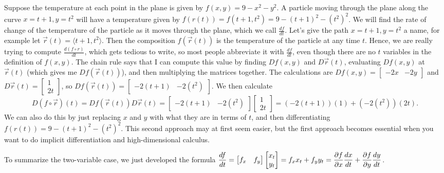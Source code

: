 \begin{example}
Suppose the temperature at each point
in the plane is given by {$f(x,y) = 9-x^2-y^2$}.  A particle moving
through the plane along the curve $x=t+1, y=t^2$ will have a
temperature given by $f(r(t)) = f(t+1,t^2) = 9-(t+1)^2-(t^2)^2$.  We
will find the rate of change of the temperature of the particle as it
moves through the plane, which we call {$\frac{df}{dt}$}. Let's give
the path $x=t+1, y=t^2$ a name, for example let {$\vec r(t) =
  \langle t+1,t^2\rangle$}.  Then the composition {$f(\vec r(t))$} is
the temperature of the particle at any time {$t$}.  Hence, we are
really trying to compute {$\frac{d(f\circ r)}{dt}$}, which gets tedious to
write, so most people abbreviate it with {$\frac{df}{dt}$}, even
though there are no {$t$} variables in the definition of {$f(x,y)$}.  The
chain rule says that I can compute this value by finding {$Df(x,y)$}
and {$D\vec r(t)$}, evaluating {$Df(x,y)$} at {$\vec r(t)$} (which
gives me {$Df(\vec r(t))$}), and then multiplying the matrices
together. The calculations are $Df(x,y) = \begin{bmatrix}-2x &
  -2y\end{bmatrix}$ and $D\vec r(t) = \begin{bmatrix}1\\
  2t\end{bmatrix}$, so $Df(\vec r(t)) =
\begin{bmatrix}-2(t+1) & -2(t^2)\end{bmatrix}$. We then calculate 
$$D(f\circ \vec r)(t) = Df(\vec r(t))D\vec r(t)=\begin{bmatrix}-2(t+1) &
  -2(t^2)\end{bmatrix} \begin{bmatrix}1\\ 2t\end{bmatrix}=
(-2(t+1))(1) + (-2(t^2))(2t).$$ We can also do this by just replacing
{$x$} and {$y$} with what they are in terms of $t$, and then
differentiating $f(r(t)) = 9-(t+1)^2-(t^2)^2$.  This second approach
may at first seem easier, but the first approach becomes essential
when you want to do implicit differentiation and high-dimensional
calculus.
\end{example}
  To summarize the two-variable case, we just developed the
formula $\displaystyle \frac{df}{dt}=\begin{bmatrix}f_x &
  f_y\end{bmatrix} \begin{bmatrix}x_t\\ y_t\end{bmatrix}=f_xx_t+f_yy_t
= \frac{\partial f}{\partial x}\frac{dx}{dt}+\frac{\partial f}{\partial y}\frac{dy}{dt}$.

